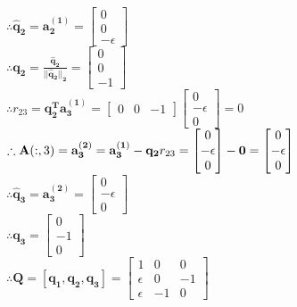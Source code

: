 \documentclass[english,onecolumn]{IEEEtran}
\begin{document}
\begin{enumerate}
    $\therefore \mathbf{\hat{q}_2 = a_2^{(1)}} = 
    \begin{bmatrix}
    0 \\ 0 \\ -\epsilon
    \end{bmatrix}$\\
    $\therefore    \mathbf{q_2 = \frac{\hat{q}_2}{||\hat{q}_2||_2}} = 
    \begin{bmatrix}
    0 \\ 0\\ -1
    \end{bmatrix}$\\
    $\therefore    r_{23} = \mathbf{q_2^T a_3^{(1)}} = 
    \begin{bmatrix}
    0 & 0& -1
    \end{bmatrix}
    \begin{bmatrix}
    0 \\ -\epsilon \\ 0 
    \end{bmatrix} = 0
    $\\
    $\therefore    \mathbf{A}(:,3) = \mathbf{a_3^{(2)}} = \mathbf{a_3^{(1)} - q_2}  r_{23} = 
    \begin{bmatrix}
    0 \\ -\epsilon \\ 0 
    \end{bmatrix} - {\bf 0} = 
    \begin{bmatrix}
    0 \\ -\epsilon \\ 0 
    \end{bmatrix}$\\
    $\therefore    \mathbf{\hat{q}_3  = a_3^{(2)}}=\begin{bmatrix}
    0 \\ -\epsilon \\ 0 
    \end{bmatrix}$\\
    $\therefore \mathbf{q_3} = \begin{bmatrix}
    0 \\ -1 \\ 0 
    \end{bmatrix}
    $\\ 
    $\therefore     \mathbf{Q} = [\mathbf{q_1,q_2,q_3}] = 
    \begin{bmatrix}
    1 & 0 & 0 \\
    \epsilon & 0 & -1 \\
    \epsilon & -1 & 0 
    \end{bmatrix}
    $\\
    

\end{enumerate}
\end{document}
